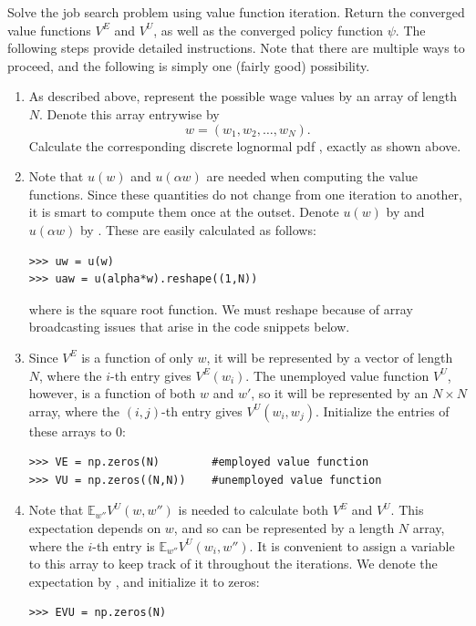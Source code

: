 \begin{problem}
Solve the job search problem using value function iteration. Return the converged value functions
$V^E$ and $V^U$, as well as the converged policy function $\psi$. The following steps provide detailed
instructions. Note that there are multiple ways to proceed, and the following is simply one (fairly good)
possibility.
\begin{enumerate}

   \item As described above, represent the possible wage values by an array  of length
   $N$. Denote this array entrywise by
   \[
   w = (w_1,w_2,\ldots,w_N).
   \]
   Calculate the corresponding discrete lognormal pdf , exactly as shown above.

   \item Note that $u(w)$ and $u(\alpha w)$ are needed when computing the value functions.
   Since these quantities do not change from one iteration to another, it is smart to
   compute them once at the outset. Denote $u(w)$ by  and $u(\alpha w)$ by .
   These are easily calculated as follows:
\begin{lstlisting}
>>> uw = u(w)
>>> uaw = u(alpha*w).reshape((1,N))
\end{lstlisting}
    where  is the square root function. We must reshape  because of array broadcasting
    issues that arise in the code snippets below.

   \item Since $V^E$ is a function of only $w$, it will be represented by a vector of length $N$, where
   the $i$-th entry gives $V^E(w_i)$. The unemployed value function $V^U$, however,
   is a function of both $w$ and $w'$, so it will be represented by an $N \times N$ array,
   where the $(i,j)$-th entry gives $V^U(w_i,w_j)$. Initialize the entries of these arrays to 0:
\begin{lstlisting}
>>> VE = np.zeros(N)        #employed value function
>>> VU = np.zeros((N,N))    #unemployed value function
\end{lstlisting}

   \item Note that $\mathbb{E}_{w''}V^U(w,w'')$  is needed to calculate both $V^E$ and $V^U$.
   This expectation depends on $w$, and so can be represented by a length $N$ array, where the
   $i$-th entry is $\mathbb{E}_{w''}V^U(w_i,w'')$.
   It is convenient to assign a variable to this array to keep track of it throughout the iterations.
   We denote the expectation by , and initialize it to zeros:
\begin{lstlisting}
>>> EVU = np.zeros(N)
\end{lstlisting}


\end{enumerate}
\end{problem}

